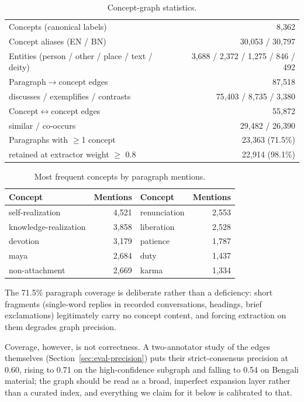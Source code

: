\documentclass[11pt,a4paper]{article}
\begin{document}
\begin{table}[t]
\centering
\caption{Concept-graph statistics.}
\label{tab:graph}
\begin{tabular}{lr}
\toprule
Concepts (canonical labels) & 8{,}362\\
Concept aliases (EN / BN) & 30{,}053 / 30{,}797\\
Entities (person / other / place / text / deity) & 3{,}688 / 2{,}372 / 1{,}275 / 846 / 492\\
Paragraph$\to$concept edges & 87{,}518\\
\quad discusses / exemplifies / contrasts & 75{,}403 / 8{,}735 / 3{,}380\\
Concept$\leftrightarrow$concept edges & 55{,}872\\
\quad similar / co-occurs & 29{,}482 / 26{,}390\\
Paragraphs with $\geq$1 concept & 23{,}363 (71.5\%)\\
\quad retained at extractor weight $\geq$ 0.8 & 22{,}914 (98.1\%)\\
\bottomrule
\end{tabular}
\end{table}

\begin{table}[t]
\centering
\caption{Most frequent concepts by paragraph mentions.}
\label{tab:topconcepts}
\begin{tabular}{lr@{\qquad}lr}
\toprule
Concept & Mentions & Concept & Mentions\\
\midrule
self-realization      & 4{,}521 & renunciation & 2{,}553\\
knowledge-realization & 3{,}858 & liberation   & 2{,}528\\
devotion              & 3{,}179 & patience     & 1{,}787\\
maya                  & 2{,}684 & duty         & 1{,}437\\
non-attachment        & 2{,}669 & karma        & 1{,}334\\
\bottomrule
\end{tabular}
\end{table}

The 71.5\% paragraph coverage is deliberate rather than a deficiency:
short fragments (single-word replies in recorded conversations, headings,
brief exclamations) legitimately carry no concept content, and forcing
extraction on them degrades graph precision.

Coverage, however, is not correctness. A two-annotator study of the
edges themselves (Section~\ref{sec:eval-precision}) puts their
strict-consensus precision at 0.60, rising to 0.71 on the
high-confidence subgraph and falling to 0.54 on Bengali material; the
graph should be read as a broad, imperfect expansion layer rather than a
curated index, and everything we claim for it below is calibrated to
that.
\end{document}
